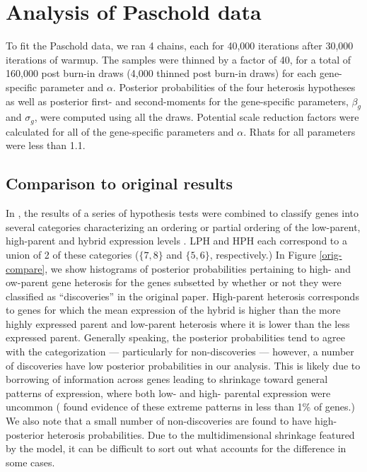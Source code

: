 \section{Analysis of Paschold data}
\label{analysis}
To fit the Paschold data, we ran 4 chains, each for 40,000 iterations after 30,000 iterations of warmup. The samples were thinned by a factor of 40, for a total of 160,000 post burn-in draws (4,000 thinned post burn-in draws) for each gene-specific parameter and $\alpha$. Posterior probabilities of the four heterosis hypotheses as well as posterior first- and second-moments for the gene-specific parameters, $\beta_g$ and $\sigma_g$, were computed using all the draws. Potential scale reduction factors were calculated for all of the gene-specific parameters and $\alpha$. Rhats for all parameters were less than 1.1.

\subsection{Comparison to original results}

In \citet{paschold}, the results of a series of hypothesis tests were combined to classify genes into several categories characterizing an ordering or partial ordering of the low-parent, high-parent and hybrid expression levels \citep[p.2448]{paschold}. LPH and HPH each correspond to a union of 2 of these categories ($\{7,8\}$ and $\{5,6\}$, respectively.) In Figure \ref{orig-compare}, we show histograms of posterior probabilities pertaining to high- and ow-parent gene heterosis for the genes subsetted by whether or not they were classified as ``discoveries'' in the original paper. High-parent heterosis corresponds to genes for which the mean expression of the hybrid is higher than the more highly expressed parent and low-parent heterosis where it is lower than the less expressed parent. Generally speaking, the posterior probabilities tend to agree with the categorization --- particularly for non-discoveries --- however, a number of discoveries have low posterior probabilities in our analysis. This is likely due to borrowing of information across genes leading to shrinkage toward general patterns of expression, where both low- and high- parental expression were uncommon (\citet{paschold} found evidence of these extreme patterns in less than 1\% of genes.) We also note that a small number of non-discoveries are found to have high-posterior heterosis probabilities. Due to the multidimensional shrinkage featured by the model, it can be difficult to sort out what accounts for the difference in some cases.

